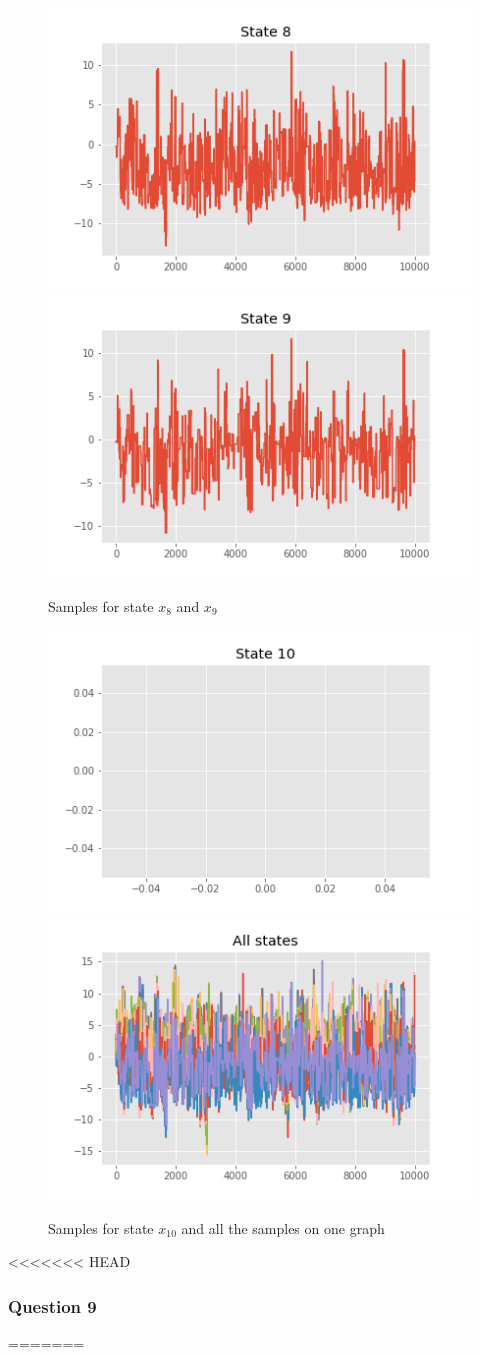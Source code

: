 \documentclass[]{article}
\begin{document}
	\begin{figure}[H]
		\begin{center}
			\includegraphics[width=.4\textwidth]{task2/figures/T_2_2/Q1/plt_x8.png}
			\includegraphics[width=.4\textwidth]{task2/figures/T_2_2/Q1/plt_x9.png}
			
			\caption*{Samples for state $x_8$ and $x_9$}
		\end{center}
	\end{figure}
	
	\begin{figure}[H]
		\begin{center}
			\includegraphics[width=.4\textwidth]{task2/figures/T_2_2/Q1/plt_x10.png}
			\includegraphics[width=.4\textwidth]{task2/figures/T_2_2/Q1/plt_x_all.png}
			
			\caption*{Samples for state $x_10$ and all the samples on one graph}
		\end{center}
	\end{figure}
	
<<<<<<< HEAD
	\subsubsection*{Question 9}
=======
\end{document}
